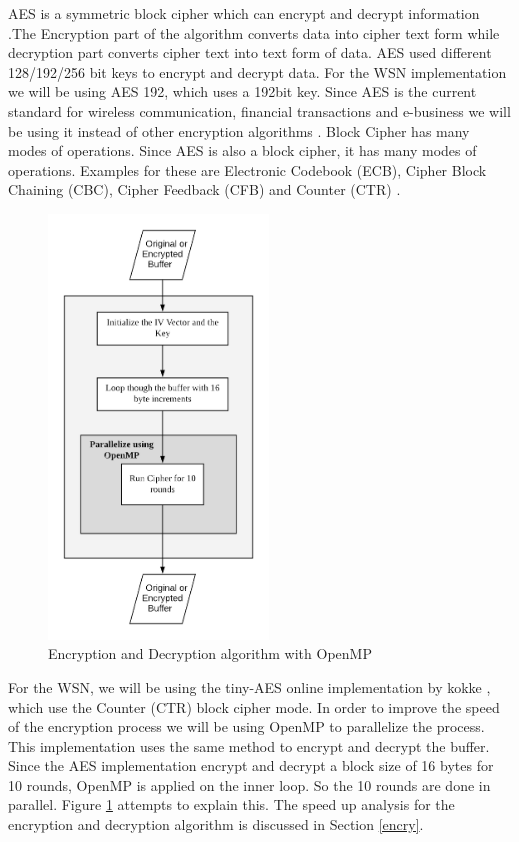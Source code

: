 \documentclass[conference]{IEEEtran}
\begin{document}
	AES is a symmetric block cipher which can encrypt and decrypt information \cite{rouse_cobb}.The Encryption part of the algorithm converts data into cipher text form while decryption part converts cipher text into text form of data.  AES used different 128/192/256 bit keys to encrypt and decrypt data. For the WSN implementation we will be using AES 192, which uses a 192bit key. Since AES is the current standard for wireless communication, financial transactions and e-business we will be using it instead of other encryption algorithms \cite{rfwirelessworld}. Block Cipher has many modes of operations. Since AES is also a block cipher, it has many modes of operations. Examples for these are Electronic Codebook (ECB), Cipher Block Chaining (CBC), Cipher Feedback (CFB) and Counter (CTR) \cite{meghna_2019}.
	
	\begin{figure}[!h]
		\centering
		\includegraphics[width=2.3in,keepaspectratio]{encdec}
		\caption{Encryption and Decryption algorithm with OpenMP}
		\label{encdec}
	\end{figure}	

	For the WSN, we will be using the tiny-AES online implementation by kokke \cite{kokke_2019}, which use the Counter (CTR) block cipher mode. In order to improve the speed of the encryption process we will be using OpenMP \cite{openmp_2018} to parallelize the process. This implementation uses the same method to encrypt and decrypt the buffer. Since the AES implementation encrypt and decrypt a block size of 16 bytes for 10 rounds, OpenMP is applied on the inner loop. So the 10 rounds are done in parallel. Figure \ref{encdec} attempts to explain this. The speed up analysis for the encryption and decryption algorithm is discussed in Section \ref{encry}.
	
\end{document}
